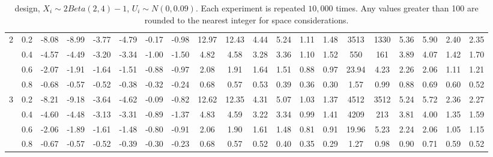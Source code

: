 \begin{table}
\begin{threeparttable}
\begin{tabular}{c c|c c c c c c|c c c c c c|c c c c c c}
\hline
\multirow{4}{*}{2} & 0.2 & -8.08 & -8.99 & -3.77 & -4.79 & -0.17 & -0.98 & 12.97 & 12.43 & 4.44 & 5.24 & 1.11 & 1.48 & 3513 & 1330 & 5.36 & 5.90 & 2.40 & 2.35 \\
& 0.4 & -4.57 & -4.49 & -3.20 & -3.34 & -1.00 & -1.50 & 4.82 & 4.58 & 3.28 & 3.36 & 1.10 & 1.52 & 550 & 161 & 3.89 & 4.07 & 1.42 & 1.70 \\
& 0.6 & -2.07 & -1.91 & -1.64 & -1.51 & -0.88 & -0.97 & 2.08 & 1.91 & 1.64 & 1.51 & 0.88 & 0.97 & 23.94 & 4.23 & 2.26 & 2.06 & 1.11 & 1.21 \\
& 0.8 & -0.68 & -0.57 & -0.52 & -0.38 & -0.32 & -0.24 & 0.68 & 0.57 & 0.53 & 0.39 & 0.36 & 0.30 & 1.57 & 0.99 & 0.88 & 0.69 & 0.60 & 0.52 \\
\hline
\multirow{4}{*}{3} & 0.2 & -8.21 & -9.18 & -3.64 & -4.62 & -0.09 & -0.82 & 12.62 & 12.35 & 4.31 & 5.07 & 1.03 & 1.37 & 4512 & 3512 & 5.24 & 5.72 & 2.36 & 2.27 \\
& 0.4 & -4.60 & -4.48 & -3.13 & -3.31 & -0.89 & -1.37 & 4.83 & 4.59 & 3.22 & 3.34 & 0.99 & 1.41 & 4209 & 213 & 3.81 & 4.00 & 1.35 & 1.59 \\
& 0.6 & -2.06 & -1.89 & -1.61 & -1.48 & -0.80 & -0.91 & 2.06 & 1.90 & 1.61 & 1.48 & 0.81 & 0.91 & 19.96 & 5.23 & 2.24 & 2.06 & 1.05 & 1.15 \\
& 0.8 & -0.67 & -0.57 & -0.52 & -0.39 & -0.30 & -0.23 & 0.68 & 0.57 & 0.52 & 0.40 & 0.35 & 0.29 & 1.27 & 0.98 & 0.90 & 0.71 & 0.59 & 0.52 \\
\hline
\hline
\end{tabular}
\caption*{\citet{ludwig2007does} design, $X_i \sim 2Beta(2,4) - 1$, $U_i \sim N(0,0.09)$. Each experiment is repeated $10,000$ times. Any values greater than 100 are rounded to the nearest integer for space considerations.}
\label{table estimation lm beta}
\end{threeparttable}
\end{table}
